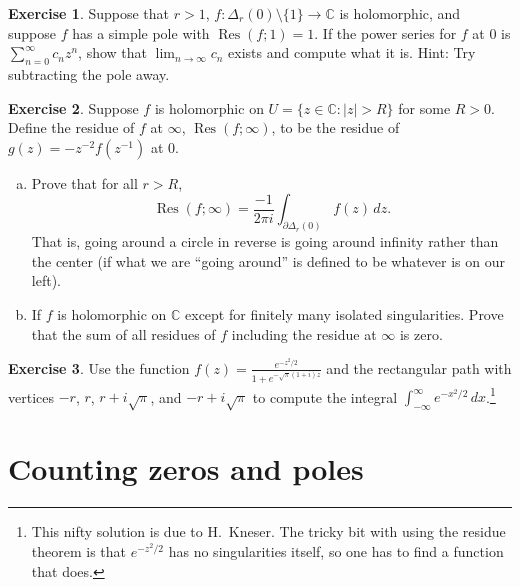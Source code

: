 \documentclass[12pt,openany]{book}
\newcommand{\sabs}[1]{\lvert {#1} \rvert}
\newcommand{\C}{{\mathbb{C}}}
\newcommand{\myquote}[1]{``#1''}
\theoremstyle{plain}
\theoremstyle{remark}
\theoremstyle{definition}
\newenvironment{exbox}{%
    \def\FrameCommand{\vrule width 1pt \relax\hspace{10pt}}%
    \MakeFramed{\advance\hsize-\width\FrameRestore}%
}{%
    \endMakeFramed
}
\newenvironment{exparts}{%
    \leavevmode\begin{enumerate}[a),noitemsep,topsep=0pt,parsep=0pt,partopsep=0pt]
}{%
    \end{enumerate}
}
\theoremstyle{exercise}
\newtheorem{exercise}{Exercise}[section]
\theoremstyle{example}
\begin{document}
\begin{savenotes}
\begin{exbox}
\begin{exercise}
Suppose that $r > 1$, $f \colon \Delta_r(0) \setminus \{ 1 \} \to \C$ is
holomorphic, and suppose $f$ has a simple pole with $\operatorname{Res}(f;1) = 1$.
If the power series for $f$ at $0$ is $\sum_{n=0}^\infty c_n z^n$, show that
$\lim_{n\to \infty} c_n$ exists and compute what it is.  Hint: Try
subtracting the pole away.
\end{exercise}

\begin{exercise}
Suppose $f$ is holomorphic on $U = \{ z \in \C : \sabs{z} > R \}$ for 
some $R > 0$.
Define the residue of $f$ at $\infty$,
$\operatorname{Res}(f;\infty)$, to be the residue
of $g(z) = -z^{-2} f(z^{-1})$ at $0$.
\begin{exparts}
\item
Prove that for all $r > R$,
\begin{equation*}
\operatorname{Res}(f;\infty) = \frac{-1}{2\pi i} \int_{\partial \Delta_r(0)}
f(z) \, dz .
\end{equation*}
That is, going around a circle in reverse is going around infinity rather
than the center (if what we are \myquote{going around} is defined to be whatever
is on our left).
\item
If $f$ is holomorphic on $\C$ except for finitely many isolated
singularities.  Prove that the sum of all residues of $f$ including the
residue at $\infty$ is zero.
\end{exparts}
\end{exercise}

\begin{exercise}
Use the function $f(z) = \frac{e^{-z^2/2}}{1+e^{-\sqrt{\pi}(1+i)z}}$ and
the rectangular path with vertices $-r$, $r$, $r+i\sqrt{\pi}$,
and $-r+i\sqrt{\pi}$
to compute the integral $\int_{-\infty}^\infty e^{-x^2/2} \, dx$.\footnote{%
This nifty solution is due to H.\ Kneser. The tricky bit with using the
residue theorem is that $e^{-z^2/2}$ has no singularities itself,
so one has to find a function that does.}
\end{exercise}
\end{exbox}
\end{savenotes}


\section{Counting zeros and poles}
\end{document}
